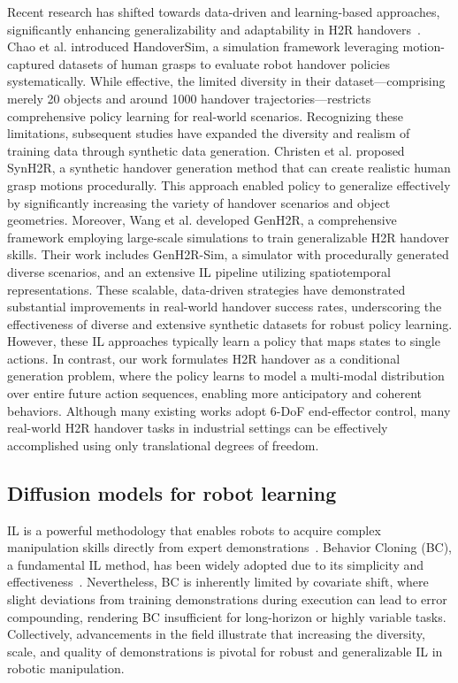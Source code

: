 \documentclass[final,5p,times,twocolumn]{elsarticle}
\begin{document}
Recent research has shifted towards data-driven and learning-based approaches, significantly enhancing generalizability and adaptability in H2R handovers~\cite{van2024enabling, mukherjee2022survey, liu2025human}. Chao et al. \cite{chao2022handoversim} introduced HandoverSim, a simulation framework leveraging motion-captured datasets of human grasps to evaluate robot handover policies systematically. While effective, the limited diversity in their dataset—comprising merely 20 objects and around 1000 handover trajectories—restricts comprehensive policy learning for real-world scenarios. Recognizing these limitations, subsequent studies have expanded the diversity and realism of training data through synthetic data generation. Christen et al. \cite{christen2024synh2r} proposed SynH2R, a synthetic handover generation method that can create realistic human grasp motions procedurally. This approach enabled policy to generalize effectively by significantly increasing the variety of handover scenarios and object geometries. Moreover, Wang et al. \cite{wang2024genh2r} developed GenH2R, a comprehensive framework employing large-scale simulations to train generalizable H2R handover skills. Their work includes GenH2R-Sim, a simulator with procedurally generated diverse scenarios, and an extensive IL pipeline utilizing spatiotemporal representations. These scalable, data-driven strategies have demonstrated substantial improvements in real-world handover success rates, underscoring the effectiveness of diverse and extensive synthetic datasets for robust policy learning. However, these IL approaches typically learn a policy that maps states to single actions. In contrast, our work formulates H2R handover as a conditional generation problem, where the policy learns to model a multi-modal distribution over entire future action sequences, enabling more anticipatory and coherent behaviors. Although many existing works adopt 6-DoF end-effector control, many real-world H2R handover tasks in industrial settings can be effectively accomplished using only translational degrees of freedom.

\subsection{Diffusion models for robot learning}
IL is a powerful methodology that enables robots to acquire complex manipulation skills directly from expert demonstrations~\cite{liu2025human, liu2021robotic, lin2022efficient}. Behavior Cloning (BC), a fundamental IL method, has been widely adopted due to its simplicity and effectiveness~\cite{ly2020learning, zhang2025dynamic}. Nevertheless, BC is inherently limited by covariate shift, where slight deviations from training demonstrations during execution can lead to error compounding, rendering BC insufficient for long-horizon or highly variable tasks. Collectively, advancements in the field illustrate that increasing the diversity, scale, and quality of demonstrations is pivotal for robust and generalizable IL in robotic manipulation.
\end{document}
